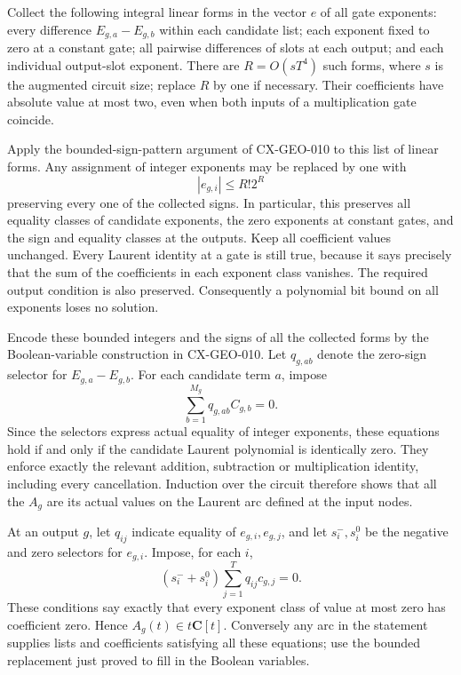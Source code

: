 Collect the following integral linear forms in the vector $e$ of all
gate exponents: every difference $E_{g,a}-E_{g,b}$ within each candidate
list; each exponent fixed to zero at a constant gate; all pairwise
differences of slots at each output; and each individual output-slot
exponent. There are $R=O(sT^4)$ such forms, where $s$ is the augmented
circuit size; replace $R$ by one if necessary. Their coefficients have
absolute value at most two, even when both inputs of a multiplication
gate coincide.

Apply the bounded-sign-pattern argument of CX-GEO-010 to this list of
linear forms. Any assignment of integer exponents may be replaced by
one with
\[
                            |e_{g,i}|\le R!2^R
\]
preserving every one of the collected signs. In particular, this
preserves all equality classes of candidate exponents, the zero
exponents at constant gates, and the sign and equality classes at the
outputs. Keep all coefficient values unchanged. Every Laurent identity
at a gate is still true, because it says precisely that the sum of the
coefficients in each exponent class vanishes. The required output
condition is also preserved. Consequently a polynomial bit bound on all
exponents loses no solution.

Encode these bounded integers and the signs of all the collected forms
by the Boolean-variable construction in CX-GEO-010. Let
$q_{g,ab}$ denote the zero-sign selector for
$E_{g,a}-E_{g,b}$. For each candidate term $a$, impose
\[
                       \sum_{b=1}^{M_g}q_{g,ab}C_{g,b}=0.
\]
Since the selectors express actual equality of integer exponents,
these equations hold if and only if the candidate Laurent polynomial
is identically zero. They enforce exactly the relevant addition,
subtraction or multiplication identity, including every cancellation.
Induction over the circuit therefore shows that all the $A_g$ are its
actual values on the Laurent arc defined at the input nodes.

At an output $g$, let $q_{ij}$ indicate equality of $e_{g,i},e_{g,j}$,
and let $s_i^-,s_i^0$ be the negative and zero selectors for $e_{g,i}$.
Impose, for each $i$,
\[
                 (s_i^-+s_i^0)\sum_{j=1}^T q_{ij}c_{g,j}=0.
\]
These conditions say exactly that every exponent class of value at
most zero has coefficient zero. Hence $A_g(t)\in t\mathbf C[t]$.
Conversely any arc in the statement supplies lists and coefficients
satisfying all these equations; use the bounded replacement just proved
to fill in the Boolean variables.

